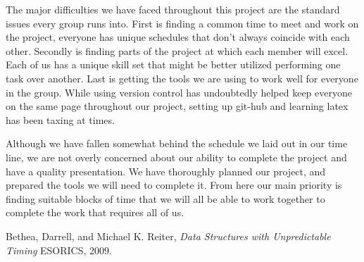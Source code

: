 \documentclass[11pt,twocolumn]{article}
\begin{document}
The major difficulties we have faced throughout this project are the standard issues every 
group runs into. First is finding a common time to meet and work on the project, everyone 
has unique schedules that don't always coincide with each other. Secondly is finding
parts of the project at which each member will excel. Each of us has a unique skill set 
that might be better utilized performing one task over another. Last is getting the 
tools we are using to work well for everyone in the group. While using version control has 
undoubtedly helped keep everyone on the same page throughout our project, 
setting up git-hub and learning latex has been taxing at times.

Although we have fallen somewhat behind the schedule we laid out in our time line,
we are not overly concerned about our ability to complete the project and have a quality
presentation. We have thoroughly planned our project, and prepared the tools we will
need to complete it. From here our main priority is finding suitable blocks of time that
we will all be able to work together to complete the work that requires all of us.

\pagebreak
\onecolumn

\begin{thebibliography}{9}
	
	Bethea, Darrell, and Michael K. Reiter,
	\emph{Data Structures with Unpredictable Timing}
	ESORICS,
	2009.
	
\end{thebibliography}
\end{document}
